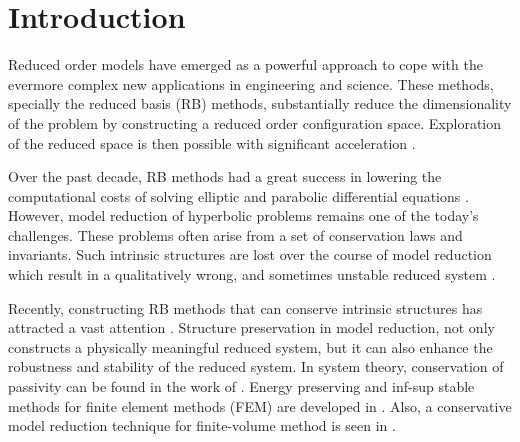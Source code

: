 \section{Introduction}
\label{sec:intro}

Reduced order models have emerged as a powerful approach to cope with the evermore complex new applications in engineering and science. These methods, specially the reduced basis (RB) methods, substantially reduce the dimensionality of the problem by constructing a reduced order configuration space. Exploration of the reduced space is then possible with significant acceleration \cite{hesthaven2015certified}.

Over the past decade, RB methods had a great success in lowering the computational costs of solving elliptic and parabolic differential equations \cite{ito1998reduced,ito2001reduced}. However, model reduction of hyperbolic problems remains one of the today's challenges. These problems often arise from a set of conservation laws and invariants. Such intrinsic structures are lost over the course of model reduction which result in a qualitatively wrong, and sometimes unstable reduced system \cite{Amsallem:2014ef}.

Recently, constructing RB methods that can conserve intrinsic structures has attracted a vast attention \cite{kalashnikova2014stabilization,farhat2015structure,doi:10.1137/110836742,doi:10.1137/140959602,beattie2011structure,doi:10.1137/140978922,doi:10.1137/17M1111991}. Structure preservation in model reduction, not only constructs a physically meaningful reduced system, but it can also enhance the robustness and stability of the reduced system. In system theory, conservation of passivity can be found in the work of \cite{polyuga2010structure,gugercin2012structure}. Energy preserving and inf-sup stable methods for finite element methods (FEM) are developed in \cite{farhat2015structure,ballarin2015supremizer}. Also, a conservative model reduction technique for finite-volume method is seen in \cite{1711.11550}.


